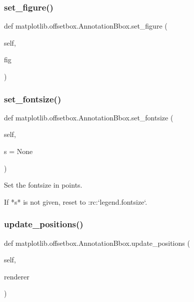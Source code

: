 \subsubsection{\texorpdfstring{set\+\_\+figure()}{set\_figure()}}
{\footnotesize\ttfamily def matplotlib.\+offsetbox.\+Annotation\+Bbox.\+set\+\_\+figure (\begin{DoxyParamCaption}\item[{}]{self,  }\item[{}]{fig }\end{DoxyParamCaption})}

\mbox{\label{classmatplotlib_1_1offsetbox_1_1AnnotationBbox_a70c19d284664e0c571e7eca892336beb}} 
\subsubsection{\texorpdfstring{set\+\_\+fontsize()}{set\_fontsize()}}
{\footnotesize\ttfamily def matplotlib.\+offsetbox.\+Annotation\+Bbox.\+set\+\_\+fontsize (\begin{DoxyParamCaption}\item[{}]{self,  }\item[{}]{s = {\ttfamily None} }\end{DoxyParamCaption})}

\begin{DoxyVerb}Set the fontsize in points.

If *s* is not given, reset to :rc:`legend.fontsize`.
\end{DoxyVerb}
 \mbox{\label{classmatplotlib_1_1offsetbox_1_1AnnotationBbox_a1401cedd0a7bfc6a7385deff619451ee}} 
\subsubsection{\texorpdfstring{update\+\_\+positions()}{update\_positions()}}
{\footnotesize\ttfamily def matplotlib.\+offsetbox.\+Annotation\+Bbox.\+update\+\_\+positions (\begin{DoxyParamCaption}\item[{}]{self,  }\item[{}]{renderer }\end{DoxyParamCaption})}

